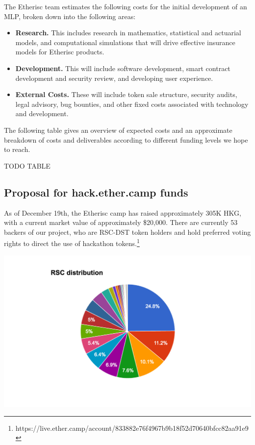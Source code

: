 \documentclass[12pt]{article}
\begin{document}
The Etherisc team estimates the following costs for the initial development of an MLP, broken down into the following areas:

\begin{itemize}
    \item \textbf{Research.} This includes research in mathematics, statistical and actuarial models, and computational simulations that will drive effective insurance models for Etherisc products.

    \item \textbf{Development.} This will include software development, smart contract development and security review, and developing user experience.

    \item \textbf{External Costs.} These will include token sale structure, security audits, legal advisory, bug bounties, and other fixed costs associated with technology and development.
\end{itemize}

The following table gives an overview of expected costs and an approximate breakdown of costs and deliverables according to different funding levels we hope to reach.

TODO TABLE

\subsection{Proposal for hack.ether.camp funds}

As of December 19th, the Etherisc camp has raised approximately 305K HKG, with a current market value of approximately \$20,000. There are currently 53 backers of our project, who are RSC-DST token holders and hold preferred voting rights to direct the use of hackathon tokens.\footnote{https://live.ether.camp/account/833882e76f4967b9b18f52d70640bfcc82aa91e9}

\begin{center}
  \includegraphics[scale=.75]{distribution}
\end{center}
\end{document}
